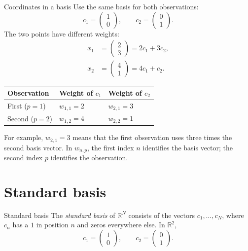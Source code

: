 \documentclass[a4paper,12pt,oneside]{report}
\begin{document}
\begin{framedexample}{Coordinates in a basis}
Use the same basis for both observations:
\[
  c_1=\begin{pmatrix}1\\0\end{pmatrix},\qquad
  c_2=\begin{pmatrix}0\\1\end{pmatrix}.
\]
The two points have different weights:
\[
\begin{aligned}
  x_1&=\begin{pmatrix}2\\3\end{pmatrix}=2c_1+3c_2,\\[4pt]
  x_2&=\begin{pmatrix}4\\1\end{pmatrix}=4c_1+c_2.
\end{aligned}
\]
\begin{center}
\begin{tabular}{@{}lll@{}}
\toprule
\textbf{Observation} & \textbf{Weight of $c_1$} & \textbf{Weight of $c_2$} \\
\midrule
First ($p=1$) & $w_{1,1}=2$ & $w_{2,1}=3$ \\
Second ($p=2$) & $w_{1,2}=4$ & $w_{2,2}=1$ \\
\bottomrule
\end{tabular}
\end{center}
For example, $w_{2,1}=3$ means that the first observation uses three
times the second basis vector. In $w_{n,p}$, the first index $n$ identifies the
basis vector; the second index $p$ identifies the observation.
\end{framedexample}

\clearpage
\section{Standard basis}

\begin{frameddefn}{Standard basis}\label{def:standard-basis}
The \emph{standard basis} of $\mathbb{R}^{N}$ consists of the vectors
$c_1,\ldots,c_N$, where $c_n$ has a $1$ in position $n$ and zeros
everywhere else. In $\mathbb{R}^{2}$,
\[
  c_1=\begin{pmatrix}1\\0\end{pmatrix},\qquad
  c_2=\begin{pmatrix}0\\1\end{pmatrix}.
\]
\end{frameddefn}
\end{document}
